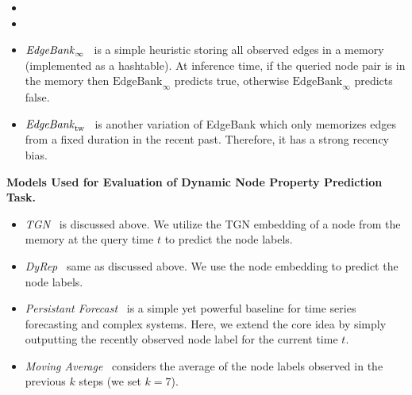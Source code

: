 \begin{itemize}[leftmargin=*]
    \item {}

    \item {}
    
    \item $\text{\emph{EdgeBank}}_{\infty}$~\cite{poursafaeitowards} is a simple heuristic storing all observed edges in a memory (implemented as a hashtable). 
    At inference time, if the queried node pair is in the memory then $\text{EdgeBank}_{\infty}$ predicts true, otherwise $\text{EdgeBank}_{\infty}$ predicts false.
    
    \item $\text{\emph{EdgeBank}}_{\text{tw}}$~\cite{poursafaeitowards} is another variation of EdgeBank which only memorizes edges from a fixed duration in the recent past. Therefore, it has a strong recency bias.  
\end{itemize}

\textbf{Models Used for Evaluation of Dynamic Node Property Prediction Task.}
\begin{itemize}[leftmargin=*]
    \item \emph{TGN}~\cite{rossi2020temporal} is discussed above. We utilize the TGN embedding of a node from the memory at the query time $t$ to predict the node labels.  

    \item \emph{DyRep}~\cite{trivedi2019dyrep} same as discussed above. We use the node embedding to predict the node labels. 
    
    \item \emph{Persistant Forecast}~\cite{salcedo2022persistence} is a simple yet powerful baseline for time series forecasting and complex systems. Here, we extend the core idea by simply outputting the recently observed node label for the current time $t$. 
    
    \item \emph{Moving Average}~\cite{panch2018artificial} considers the average of the node labels observed in the previous $k$ steps (we set $k=7$). 
\end{itemize}



